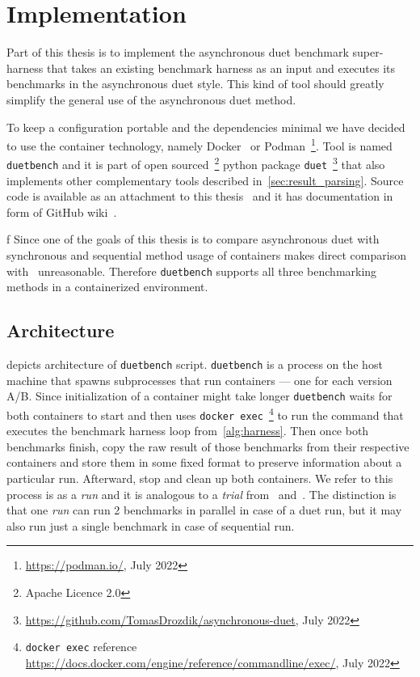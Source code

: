 \chapter{Implementation}

Part of this thesis is to implement the asynchronous duet benchmark super-harness that takes an existing benchmark harness as an input and executes its benchmarks in the asynchronous duet style.
This kind of tool should greatly simplify the general use of the asynchronous duet method.

To keep a configuration portable and the dependencies minimal we have decided to use the container technology, namely Docker~\cite{merkel2014docker} or Podman~\footnote{\url{https://podman.io/}, July 2022}.
Tool is named \lstinline{duetbench} and it is part of open sourced~\footnote{Apache Licence 2.0} python package \lstinline{duet}~\footnote{\url{https://github.com/TomasDrozdik/asynchronous-duet}, July 2022} that also implements other complementary tools described in~\cref{sec:result_parsing}.
Source code is available as an attachment to this thesis~ and it has documentation in form of GitHub wiki~\cite{wiki}.

f
Since one of the goals of this thesis is to compare asynchronous duet with synchronous and sequential method usage of containers makes direct comparison with~\citet{bulej2020duet} unreasonable.
Therefore \lstinline{duetbench} supports all three benchmarking methods in a containerized environment.

\section{Architecture}

 depicts architecture of \lstinline{duetbench} script.
\lstinline{duetbench} is a process on the host machine that spawns subprocesses that run containers --- one for each version A/B.
Since initialization of a container might take longer \lstinline{duetbench} waits for both containers to start and then uses \lstinline{docker exec}~\footnote{\lstinline{docker exec} reference \url{https://docs.docker.com/engine/reference/commandline/exec/}, July 2022} to run the command that executes the benchmark harness loop from~\cref{alg:harness}.
Then once both benchmarks finish, copy the raw result of those benchmarks from their respective containers and store them  in some fixed format to preserve information about a particular run.
Afterward, stop and clean up both containers.
We refer to this process is as a \emph{run} and it is analogous to a \emph{trial} from~\citet{laaber2019software} and~\citet{abedi2017conducting}.
The distinction is that one \emph{run} can run 2 benchmarks in parallel in case of a duet run, but it may also run just a single benchmark in case of sequential run.

